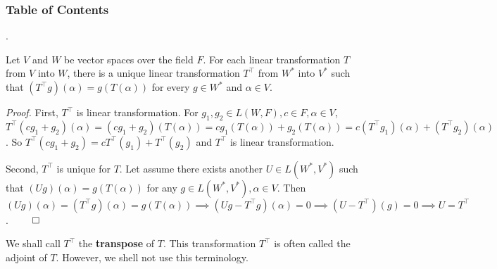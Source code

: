 \documentclass[8pt]{beamer}
\newcommand{\tb}[1]{\textbf{#1}}
\newcommand{\ti}[1]{\textit{#1}}
\begin{document}
\begingroup
    \begin{frame}
        \frametitle{Table of Contents}
        \tableofcontents[currentsubsection]
    \end{frame}
\endgroup

\begin{frame}{.}
    \begin{theorem}
        Let $V$ and $W$ be vector spaces over the field $F$.
        For each linear transformation $T$ from $V$ into $W$, there is a unique linear transformation $T^\top$ from $W^\ast$ into $V^\ast$ such that $(T^\top g) (\alpha) = g(T (\alpha))$ for every $g \in W^\ast$ and $\alpha \in V$.
    \end{theorem}
    \ti{Proof.}
    First, $T^\top$ is linear transformation.
    For $g_1, g_2 \in L(W, F), c \in F, \alpha \in V$, $T^\top(cg_1 + g_2)(\alpha)=(cg_1 + g_2)(T(\alpha)) = cg_1(T(\alpha)) + g_2 (T(\alpha)) = c(T^\top g_1)(\alpha) + (T^\top g_2) (\alpha)$.
    So $T^\top (cg_1 + g_2) = c T^\top (g_1) + T^\top (g_2)$ and $T^\top$ is linear transformation.

    Second, $T^\top$ is unique for $T$. Let assume there exists another $U \in L(W^\ast, V^\ast)$ such that $(Ug)(\alpha) = g(T(\alpha))$ for any $g \in L(W^\ast, V^\ast), \alpha \in V$.
    Then $(Ug)(\alpha) = (T^\top g)(\alpha) =g(T(\alpha)) \implies (Ug -T^\top g)(\alpha) = 0 \implies (U-T^\top)(g) = 0 \implies U = T^\top$.
    $\qed$

    \bigskip
    We shall call $T^\top$ the \tb{transpose} of $T$. This transformation $T^\top$ is often called the adjoint of $T$.
    However, we shell not use this terminology.
\end{frame}
\end{document}
